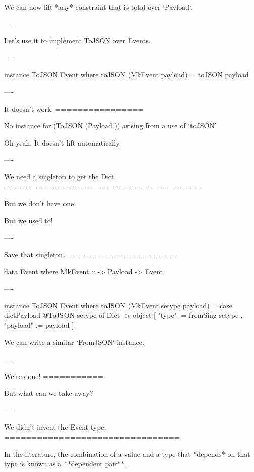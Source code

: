 We can now lift *any* constraint that is total over `Payload`.

----

Let's use it to implement ToJSON over Events.

----

\begin{hs}
  instance ToJSON Event where
    toJSON (MkEvent payload) = toJSON payload
\end{hs}

----

It doesn't work.
================

\begin{error}
  No instance for (ToJSON (Payload ))
    arising from a use of `toJSON'
\end{error}

Oh yeah. It doesn't lift automatically.

----

We need a singleton to get the Dict.
====================================

But we don't have one.

But we used to!

----

Save that singleton.
====================

\begin{raw}
  data Event where
    MkEvent :: 
            -> Payload 
            -> Event
\end{raw}

----

\begin{hs}
  instance ToJSON Event where
    toJSON (MkEvent setype payload) =
      case dictPayload @ToJSON setype of
        Dict ->
          object [ "type"    .= fromSing setype
                 , "payload" .= payload
                 ]
\end{hs}

We can write a similar `FromJSON` instance.

----

We're done!
===========

But what can we take away?

----

We didn't invent the Event type.
================================

In the literature, the combination of a value and a type that *depends* on that type is known as a **dependent pair**.


